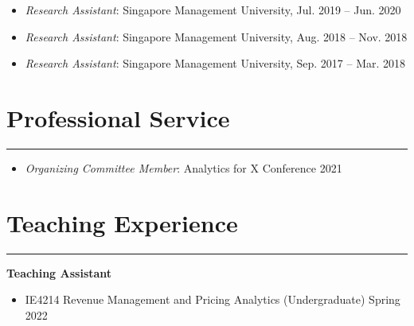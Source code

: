 \documentclass[12pt, a4paper]{article}
\begin{document}
{\begin{itemize}[leftmargin=36pt, itemsep=0pt, parsep=0.2pt, topsep=1pt]
	\item {\it Research Assistant}: Singapore Management University, Jul. 2019 -- Jun. 2020

	\item {\it Research Assistant}: Singapore Management University, Aug. 2018 -- Nov. 2018

  \item {\it Research Assistant}: Singapore Management University, Sep. 2017 -- Mar. 2018

\end{itemize}




\section*{Professional Service}
\vspace*{0.4em}
\hrule height 0.5pt
\begin{itemize}[leftmargin=36pt, itemsep=2pt, parsep=0pt, topsep=1pt]

	\item {\it Organizing Committee Member}: Analytics for X Conference 2021

\end{itemize}




\section*{Teaching Experience}
\vspace*{0.4em}
\hrule height 0.5pt
\raggedright\textbf{Teaching Assistant}
\begin{itemize}[leftmargin=36pt, itemsep=2pt, parsep=0pt, topsep=-0.5em]

	\item IE4214 Revenue Management and Pricing Analytics (Undergraduate) \hfill Spring 2022

\end{itemize}




}
\end{document}
